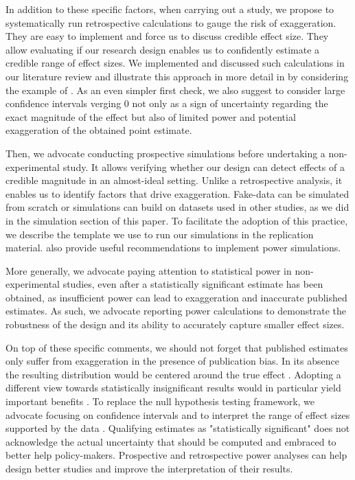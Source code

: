 \documentclass[12pt]{article}
\begin{document}
        In addition to these specific factors, when carrying out a study, we propose to systematically run retrospective calculations to gauge the risk of exaggeration. They are easy to implement and force us to discuss credible effect size. They allow evaluating if our research design enables us to confidently estimate a credible range of effect sizes. We implemented and discussed such calculations in our literature review and illustrate this approach in more detail in  by considering the example of \cite{deryugina_mortality_2019}. As an even simpler first check, we also suggest to consider large confidence intervals verging 0 not only as a sign of uncertainty regarding the exact magnitude of the effect but also of limited power and potential exaggeration of the obtained point estimate.

        Then, we advocate conducting prospective simulations before undertaking a non-experimental study. It allows verifying whether our design can detect effects of a credible magnitude in an almost-ideal setting. Unlike a retrospective analysis, it enables us to identify factors that drive exaggeration. Fake-data can be simulated from scratch or simulations can build on datasets used in other studies, as we did in the simulation section of this paper. To facilitate the adoption of this practice, we describe the template we use to run our simulations in the replication material. \cite{black_simulated_2022} also provide useful recommendations to implement power simulations.

        More generally, we advocate paying attention to statistical power in non-experimental studies, even after a statistically significant estimate has been obtained, as insufficient power can lead to exaggeration and inaccurate published estimates. As such, we advocate reporting power calculations to demonstrate the robustness of the design and its ability to accurately capture smaller effect sizes.

        On top of these specific comments, we should not forget that published estimates only suffer from exaggeration in the presence of publication bias. In its absence the resulting distribution would be centered around the true effect \citep{hernan_causal_2022}. Adopting a different view towards statistically insignificant results would in particular yield important benefits \citep{ziliak_cult_2008, wasserstein_asa_2016, mcshane_abandon_2019}. To replace the null hypothesis testing framework, we advocate focusing on confidence intervals and to interpret the range of effect sizes supported by the data \citep{amrhein_inferential_2019, romer2020praise}. 
        Qualifying estimates as "statistically significant" does not acknowledge the actual uncertainty that should be computed and embraced to better help policy-makers. Prospective and retrospective power analyses can help design better studies and improve the interpretation of their results.
        
\end{document}
